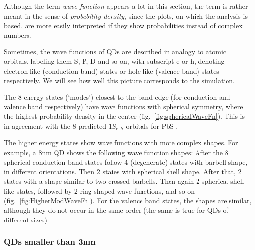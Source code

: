 \begin{REMARK}
Although the term \textit{wave function} appears a lot in this section, the term is rather meant in the sense of \textit{probability density}, since the plots, on which the analysis is based, are more easily interpreted if they show probabilities instead of complex numbers.
\end{REMARK}

Sometimes, the wave functions of QDs are described in analogy to atomic orbitals, labeling them S, P, D and so on, with subscript e or h, denoting electron-like (conduction band) states or hole-like (valence band) states respectively. We will see how well this picture corresponds to the simulation.

The 8 energy states (`modes') closest to the band edge (for conduction and valence band respectively) have wave functions with spherical symmetry, where the highest probability density in the center (fig.~\ref{fig:sphericalWaveFn}). This is in agreement with the 8 predicted $1S_{e,h}$ orbitals for PbS \cite[p.410]{ChemRev}.
	
The higher energy states show wave functions with more complex shapes. For example, a 8nm QD shows the following wave function shapes: After the 8 spherical conduction band states follow 4 (degenerate) states with barbell shape, in different orientations. Then 2 states with spherical shell shape. After that, 2 states with a shape similar to two crossed barbells. Then again 2 spherical shell-like states, followed by 2 ring-shaped wave functions, and so on (fig.~\ref{fig:HigherModWaveFn}). For the valence band states, the shapes are similar, although they do not occur in the same order (the same is true for QDs of different sizes).

\subsubsection{QDs smaller than 3nm}	


